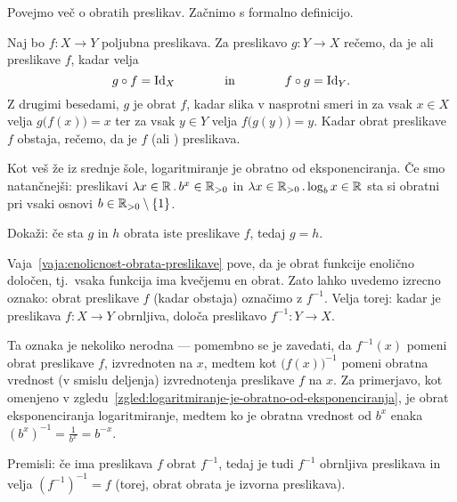 Povejmo več o obratih preslikav. Začnimo s formalno definicijo.

\begin{definicija}
Naj bo $f\colon X \to Y$ poljubna preslikava. Za preslikavo $g\colon Y \to X$ rečemo, da je  ali  preslikave $f$, kadar velja
\[g \circ f = \id[X] \qquad\qquad \text{in} \qquad\qquad f \circ g = \id[Y].\]
Z drugimi besedami, $g$ je obrat $f$, kadar slika v nasprotni smeri in za vsak $x \in X$ velja $g\big(f(x)\big) = x$ ter za vsak $y \in Y$ velja $f\big(g(y)\big) = y$. Kadar obrat preslikave $f$ obstaja, rečemo, da je $f$  (ali ) preslikava.
\end{definicija}

\begin{zgled}\label{zgled:logaritmiranje-je-obratno-od-eksponenciranja}
Kot veš že iz srednje šole, logaritmiranje je obratno od eksponenciranja. Če smo natančnejši: preslikavi $\xlam{x}[\RR]{b^x}[\RR_{> 0}]$ in $\xlam{x}[\RR_{>0}]{\log_b x}[\RR]$ sta si obratni pri vsaki osnovi $b \in \RR_{> 0} \setminus \set{1}$.
\end{zgled}

\begin{vaja}\label{vaja:enolicnost-obrata-preslikave}
Dokaži: če sta $g$ in $h$ obrata iste preslikave $f$, tedaj $g = h$.
\end{vaja}

Vaja~\ref{vaja:enolicnost-obrata-preslikave} pove, da je obrat funkcije enolično določen, tj.~vsaka funkcija ima kvečjemu en obrat. Zato lahko uvedemo izrecno oznako: obrat preslikave $f$ (kadar obstaja) označimo z $f^{-1}$. Velja torej: kadar je preslikava $f\colon X \to Y$ obrnljiva, določa preslikavo $f^{-1}\colon Y \to X$.

Ta oznaka je nekoliko nerodna --- pomembno se je zavedati, da $f^{-1}(x)$ pomeni obrat preslikave $f$, izvrednoten na $x$, medtem kot $\big(f(x)\big)^{-1}$ pomeni obratna vrednost (v smislu deljenja) izvrednotenja preslikave $f$ na $x$. Za primerjavo, kot omenjeno v zgledu~\ref{zgled:logaritmiranje-je-obratno-od-eksponenciranja}, je obrat eksponenciranja logaritmiranje, medtem ko je obratna vrednost od $b^x$ enaka $(b^x)^{-1} = \frac{1}{b^x} = b^{-x}$.

\begin{vaja}
Premisli: če ima preslikava $f$ obrat $f^{-1}$, tedaj je tudi $f^{-1}$ obrnljiva preslikava in velja $(f^{-1})^{-1} = f$ (torej, obrat obrata je izvorna preslikava).
\end{vaja}

